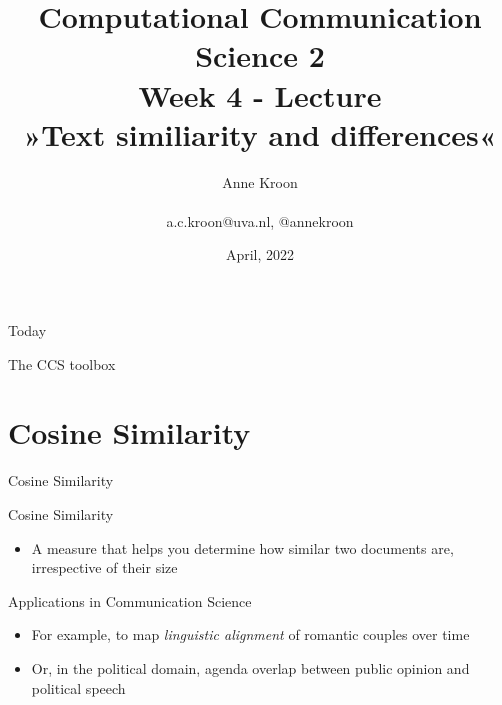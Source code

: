 \documentclass[handout]{beamer}
\title[Computational Communication Science 2]{\textbf{Computational Communication Science 2} \\Week 4 - Lecture\\ »Text similiarity and differences«}
\author[Anne Kroon]{Anne Kroon \\ ~ \\ \footnotesize{a.c.kroon@uva.nl, @annekroon} \\}
\date{April, 2022}
\institute[Digital Society Minor, University of Amsterdam]{Digital Society Minor, University of Amsterdam}
\begin{document}
	
	\begin{frame}{}
		\titlepage
	\end{frame}
	
\begin{frame}{Today}
	\tableofcontents
\end{frame}


\begin{frame}{The CCS toolbox}
	\\
	\cite{Boumans2016}
\end{frame}


\section{Cosine Similarity}

\begin{frame}{Cosine Similarity}
	\begin{block}{Cosine Similarity}
		\begin{itemize}[<+>]
			\item A measure that helps you determine how similar two documents are, irrespective of their size
		\end{itemize}
	
		\begin{exampleblock}{Applications in Communication Science}
		\begin{itemize}
			\item<1-> For example, to map \emph{linguistic alignment} of romantic couples over time \parencite{Brinberg2021}
			\item<2->Or, in the political domain, agenda overlap between public opinion and political speech \parencite{Hager2020}
		\end{itemize}
	\end{exampleblock}
	\end{block}
\end{frame}
\end{document}
